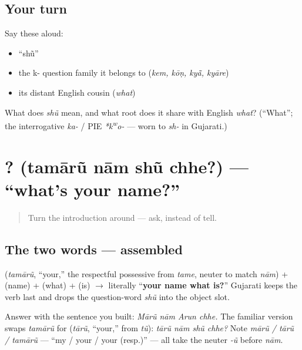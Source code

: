 \subsection*{Your turn}
Say these aloud:

\begin{itemize}
\raggedright
  \item \textquotedblleft{}shũ\textquotedblright{}
  \item the k- question family it belongs to (\emph{kem, kōṇ, kyā̃, kyāre})
  \item its distant English cousin (\emph{what})
\end{itemize}

\begin{tcolorbox}[breakable,colback=teal!4,colframe=teal!35!black,title={Before you move on}]
What does \emph{shũ} mean, and what root does it share with English \emph{what}? (\textquotedblleft{}What\textquotedblright{}; the interrogative \emph{ka-} / PIE \emph{*k\textsuperscript{w}o-} — worn to \emph{sh-} in Gujarati.)
\end{tcolorbox}
\section[\gu{તમારું} \gu{નામ} \gu{શું} \gu{છે}?]{   ? (tamārũ nām shũ chhe?) — \textquotedblleft{}what's your name?\textquotedblright{}}

\label{lesson:GU-C02-tamarun-naam-shun-chhe}



\begin{quote}
Turn the introduction around — ask, instead of tell.
\end{quote}

\subsection*{The two words — assembled}
\textbf{} (\emph{tamārũ}, \textquotedblleft{}your,\textquotedblright{} the respectful possessive from \emph{tame}, neuter to match \emph{nām}) + \textbf{} (name) + \textbf{} (what) + \textbf{} (is) $\to$ literally \textquotedblleft{}\textbf{your name what is?}\textquotedblright{} Gujarati keeps the verb last and drops the question-word \emph{shũ} into the object slot.

\begin{grammarlens}[title={Grammar Lens: answering, and the familiar form}]
Answer with the sentence you built: \emph{Mārũ nām Arun chhe.} The familiar version swaps \emph{tamārũ} for \textbf{} (\emph{tārũ}, \textquotedblleft{}your,\textquotedblright{} from \emph{tũ}): \emph{tārũ nām shũ chhe?} Note \emph{mārũ / tārũ / tamārũ} — \textquotedblleft{}my / your / your (resp.)\textquotedblright{} — all take the neuter \emph{-ũ} before \emph{nām}.
\end{grammarlens}

